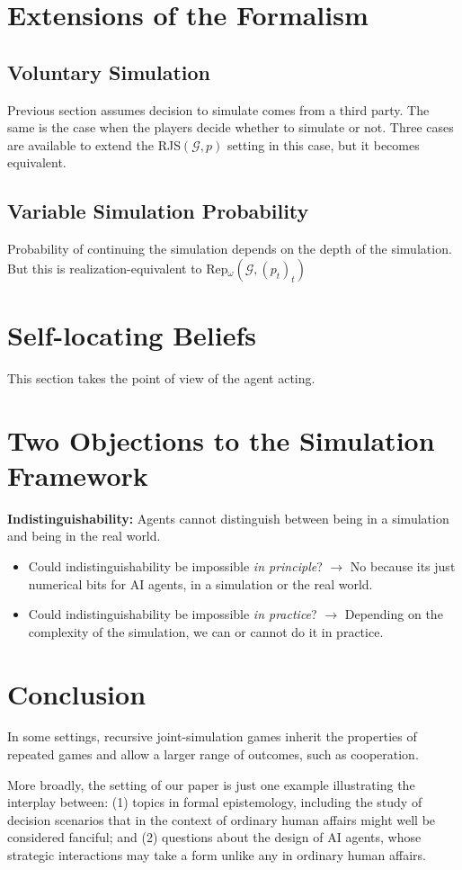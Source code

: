 \documentclass{article}
\begin{document}
\section{Extensions of the Formalism}
\subsection{Voluntary Simulation}
Previous section assumes decision to simulate comes from a third party. The same is the case when the players decide whether to simulate or not.
Three cases are available to extend the RJS$(\mathcal{G},p)$ setting in this case, but it becomes equivalent.

\subsection{Variable Simulation Probability}
Probability of continuing the simulation depends on the depth of the simulation. But this is realization-equivalent to Rep$_\omega(\mathcal{G}, (p_t)_t)$

\section{Self-locating Beliefs}
This section takes the point of view of the agent acting.

\section{Two Objections to the Simulation Framework}
\textbf{Indistinguishability:} Agents cannot distinguish between being in a simulation and being in the real world.
\begin{itemize}
    \item Could indistinguishability be impossible \textit{in principle}? $\to$ No because its just numerical bits for AI agents, in a simulation or the real world.
    \item Could indistinguishability be impossible \textit{in practice}? $\to$ Depending on the complexity of the simulation, we can or cannot do it in practice.
\end{itemize}

\section{Conclusion}
In some settings, recursive joint-simulation games inherit the properties of repeated games and allow a larger range of outcomes, such as cooperation.

More broadly, the setting of our paper is just one example illustrating the interplay between: (1) topics in formal epistemology, including the study of decision scenarios that in the context of ordinary human affairs might well be considered fanciful; and
(2) questions about the design of AI agents, whose strategic interactions may take a
form unlike any in ordinary human affairs.

\printbibliography
\end{document}
